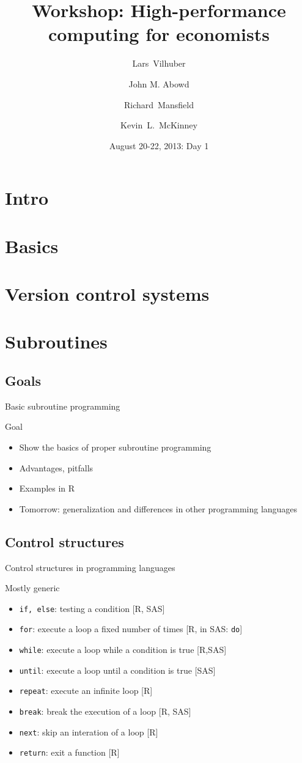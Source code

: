 \documentclass[xcolor=table,compress]{beamer}
\title[Computing for Economists]{Workshop: High-performance computing for economists}
\author[Vilhuber, Abowd, Mansfield, McKinney]{%
  Lars~Vilhuber\inst{1} \and
  John M. Abowd\inst{1} \and
  Richard~Mansfield\inst{1} \and
  Kevin~L.~McKinney %
}
\institute[Cornell]{
  \inst{1}%
   Cornell University, Economics Department,
}%
\date[August 20-22, 2013]{August 20-22, 2013: Day 1}
\begin{document}
\frame{\titlepage}
\section{Intro}
\section{Basics}
\section[VCS]{Version control systems}
\section{Subroutines}

\subsection{Goals}
\begin{frame}{Basic subroutine programming}
\begin{block}{Goal}
\begin{itemize}
\item Show the basics of proper subroutine programming
\item Advantages, pitfalls
\item Examples in R
\item Tomorrow: generalization and differences in other programming languages
\end{itemize}
\end{block}
\end{frame}
\subsection[Control]{Control structures}
\begin{frame}{Control structures in programming languages}
\small
\begin{block}{Mostly generic}
\begin{itemize}
\item \texttt{if, else}: testing a condition [R, SAS] 
\item \texttt{for}: execute a loop a fixed number of times [R, in SAS: \texttt{do}]
\item \texttt{while}: execute a loop while a condition is true [R,SAS]
\item \texttt{until}: execute a loop until a condition is true [SAS]
\item \texttt{repeat}: execute an infinite loop [R]
\item \texttt{break}: break the execution of a loop [R, SAS]
\item \texttt{next}: skip an interation of a loop [R]
\item \texttt{return}: exit a function [R]
\end{itemize}
\end{block}
\end{frame}
\end{document}
